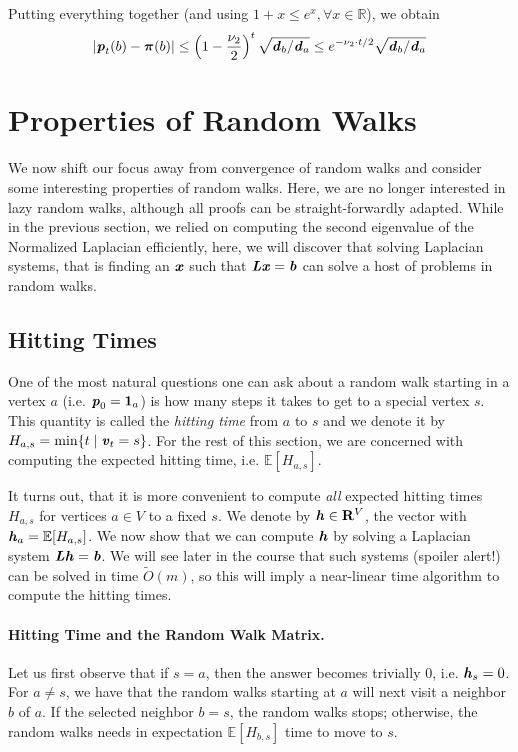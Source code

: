 Putting everything together (and using $1+x \leq e^x, \forall x \in \mathbb{R}$), we obtain 
\[  
    |\boldsymbol{\mathit{p}}_t(b) - \boldsymbol{\pi}(b)| \leq \left(1-\frac{\nu_2}{2}\right)^t \sqrt{\boldsymbol{\mathit{d}}_b/\boldsymbol{\mathit{d}}_a} \leq e^{-\nu_2 \cdot t/2} \sqrt{\boldsymbol{\mathit{d}}_b/\boldsymbol{\mathit{d}}_a} 
\]

\section{Properties of Random Walks}

We now shift our focus away from convergence of random walks and consider some interesting properties of random walks. Here, we are no longer interested in lazy random walks, although all proofs can be straight-forwardly adapted. While in the previous section, we relied on computing the second eigenvalue of the Normalized Laplacian efficiently, here, we will discover that solving Laplacian systems, that is finding an $\boldsymbol{\mathit{x}}$ such that $\boldsymbol{\mathit{L}}\boldsymbol{\mathit{x}} = \boldsymbol{\mathit{b}}$ can solve a host of problems in random walks.

\subsection{Hitting Times}

One of the most natural questions one can ask about a random walk starting in a vertex $a$ (i.e. $\boldsymbol{\mathit{p}}_0 = \boldsymbol{1}_a$) is how many steps it takes to get to a special vertex $s$. This quantity is called the \emph{hitting time} from $a$ to $s$ and we denote it by $H_{a,s} = \min \{ t \;|\; \boldsymbol{\mathit{v}}_t = s \}$. For the rest of this section, we are concerned with computing the expected hitting time, i.e. $\mathbb{E}[H_{a,s}]$.

It turns out, that it is more convenient to compute \emph{all} expected hitting times $H_{a,s}$ for vertices $a \in V$ to a fixed $s$. We denote by ${\boldsymbol{\mathit{h}}} \in \mathbf{R}^V$, the vector with ${\boldsymbol{\mathit{h}}}_a = \mathbb{E}[H_{a,s}]$. We now show that we can compute ${\boldsymbol{\mathit{h}}}$ by solving a Laplacian system $\boldsymbol{\mathit{L}} {\boldsymbol{\mathit{h}}} = \boldsymbol{\mathit{b}}$. We will see later in the course that such systems (spoiler alert!) can be solved in time $\tilde{O}(m)$, so this will imply a near-linear time algorithm to compute the hitting times.

\paragraph{Hitting Time and the Random Walk Matrix.} Let us first observe that if $s = a$, then the answer becomes trivially $0$, i.e. ${\boldsymbol{\mathit{h}}}_s = 0$. For $a \neq s$, we have that the random walks starting at $a$ will next visit a neighbor $b$ of $a$. If the selected neighbor $b = s$, the random walks stops; otherwise, the random walks needs in expectation $\mathbb{E}[H_{b,s}]$ time to move to $s$. 

